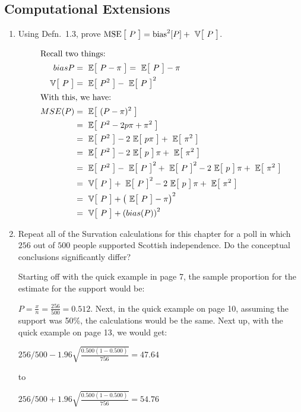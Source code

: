 \subsection*{Computational Extensions}
\begin{enumerate}
  \item Using Defn.~1.3, prove $\MSE{P} = \text{bias}^2[P] + \V{P}$.
\begin{solution}
\begin{align}
\intertext{Recall two things:}
bias{P} &= \E{P-\pi} = \E{P}-\pi \\
\V{P} &= \E{P^2}-\E{P}^2 \\
\intertext{With this, we have:}
MSE(P) &= \E{(P-\pi)^2} \\
&= \E{P^2 - 2p\pi + \pi^2} \\
&= \E{P^2} - 2\E{p\pi} + \E{\pi^2} \\
&= \E{P^2} - 2\E{p}\pi + \E{\pi^2} \\
&= \E{P^2} -\E{P}^2 + \E{P}^2 - 2\E{p}\pi + \E{\pi^2} \\
&= \V{P} +  \E{P}^2 - 2\E{p}\pi + \E{\pi^2} \\
&= \V{P} + \left( \E{P} - \pi \right)^2 \\
&= \V{P} + \left(bias(P)\right)^2
\end{align}
\end{solution}
  \item Repeat all of the Survation calculations for this chapter for a poll in which $256$ out of $500$ people supported Scottish independence. Do the conceptual conclusions significantly differ?
\begin{solution}
Starting off with the quick example in page 7, the sample proportion for the estimate for the support would be:

$P = \frac{x}{n} = \frac{256}{500} = 0.512$. Next, in the quick example on page 10, assuming the support was 50\%, the calculations would be the same. Next up, with the quick example on page 13, we would get:

$256/500 - 1.96 \sqrt{\frac{0.500(1-0.500)}{756}} = 47.64$

to

$256/500 + 1.96 \sqrt{\frac{0.500(1-0.500)}{756}} = 54.76$


\end{solution}
\end{enumerate}
